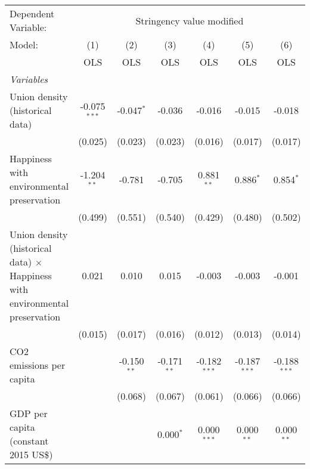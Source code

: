 
\begingroup
\centering
\begin{tabular}{lcccccc}
   \toprule
   Dependent Variable: & \multicolumn{6}{c}{Stringency value modified}\\
   Model:                                                                              & (1)            & (2)           & (3)           & (4)            & (5)            & (6)\\  
                                                                                       &  OLS           & OLS           & OLS           & OLS            & OLS            & OLS\\  
   \midrule
   \emph{Variables}\\
   Union density (historical data)                                                     & -0.075$^{***}$ & -0.047$^{*}$  & -0.036        & -0.016         & -0.015         & -0.018\\   
                                                                                       & (0.025)        & (0.023)       & (0.023)       & (0.016)        & (0.017)        & (0.017)\\   
   Happiness with environmental preservation                                           & -1.204$^{**}$  & -0.781        & -0.705        & 0.881$^{**}$   & 0.886$^{*}$    & 0.854$^{*}$\\   
                                                                                       & (0.499)        & (0.551)       & (0.540)       & (0.429)        & (0.480)        & (0.502)\\   
   Union density (historical data) $\times$ Happiness with environmental preservation  & 0.021          & 0.010         & 0.015         & -0.003         & -0.003         & -0.001\\   
                                                                                       & (0.015)        & (0.017)       & (0.016)       & (0.012)        & (0.013)        & (0.014)\\   
   CO2 emissions per capita                                                            &                & -0.150$^{**}$ & -0.171$^{**}$ & -0.182$^{***}$ & -0.187$^{***}$ & -0.188$^{***}$\\   
                                                                                       &                & (0.068)       & (0.067)       & (0.061)        & (0.066)        & (0.066)\\   
   GDP per capita (constant 2015 US\$)                                                 &                &               & 0.000$^{*}$   & 0.000$^{***}$  & 0.000$^{**}$   & 0.000$^{**}$\\   

\end{tabular}
